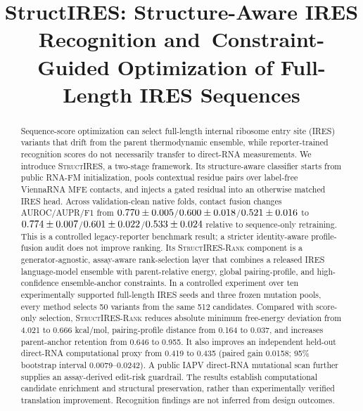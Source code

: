 \documentclass[conference]{IEEEtran}
\begin{document}
\title{StructIRES: Structure-Aware IRES Recognition and\
Constraint-Guided Optimization of Full-Length IRES Sequences}

\author{
}

\maketitle

\begin{abstract}
Sequence-score optimization can select full-length internal ribosome entry site
(IRES) variants that drift from the parent thermodynamic ensemble, while
reporter-trained recognition scores do not necessarily transfer to direct-RNA
measurements. We introduce \textsc{StructIRES}, a two-stage framework. Its
structure-aware classifier starts from public RNA-FM initialization, pools
contextual residue pairs over label-free ViennaRNA MFE contacts, and injects a
gated residual into an otherwise matched IRES head. Across
\StructIRESNativeFoldCount validation-clean native folds, contact fusion changes AUROC/AUPR/F1 from
$0.770\pm0.005$/$0.600\pm0.018$/$0.521\pm0.016$ to
$0.774\pm0.007$/$0.601\pm0.022$/$0.533\pm0.024$ relative to sequence-only
retraining. This is a controlled legacy-reporter benchmark result; a stricter
identity-aware profile-fusion audit does not improve ranking. Its
\textsc{StructIRES-Rank} component is a generator-agnostic, assay-aware
rank-selection layer that combines a released IRES language-model ensemble
with parent-relative energy, global pairing-profile, and high-confidence
ensemble-anchor constraints. In a controlled experiment over
ten experimentally supported full-length IRES seeds and three frozen mutation
pools, every method selects 50 variants from the same 512 candidates. Compared
with score-only selection, \textsc{StructIRES-Rank} reduces absolute minimum
free-energy deviation from 4.021 to 0.666 kcal/mol, pairing-profile distance
from 0.164 to 0.037, and increases parent-anchor retention from 0.646 to
0.955. It also improves an independent held-out direct-RNA computational proxy
from 0.419 to 0.435 (paired gain 0.0158; 95\% bootstrap interval
0.0079--0.0242). A public IAPV direct-RNA mutational scan further supplies an
assay-derived edit-risk guardrail. The results establish computational
candidate enrichment and structural preservation, rather than experimentally
verified translation improvement. Recognition findings are not inferred from
design outcomes.
\end{abstract}
\end{document}
